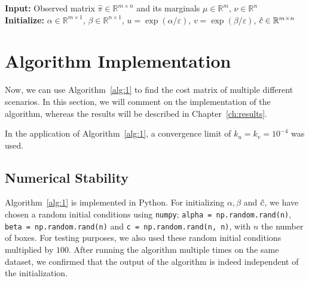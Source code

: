 \vspace{0.3cm}
\begin{algorithm}[t]
	\caption{Cost Learning Algorithm for Inverse OT}
	\textbf{Input: } Observed matrix $\hat{\pi} \in \mathbb{R}^{m \times n}$ and its marginals $\mu \in \mathbb{R}^m$, $\nu \in \mathbb{R}^n$\\
	\textbf{Initialize:} $\alpha \in \mathbb{R}^{m \times 1}$, $\beta \in \mathbb{R}^{n \times 1}$, $u = \exp(\alpha / \varepsilon)$, $v = \exp(\beta / \varepsilon)$, $\hat{c} \in \mathbb{R}^{m \times n}$ \\
	\label{alg:1}
\end{algorithm}


\section{Algorithm Implementation}
\label{sec:algimp}
Now, we can use Algorithm~\ref{alg:1} to find the cost matrix of multiple different scenarios. In this section, we will comment on the implementation of the algorithm, whereas the results will be described in Chapter~\ref{ch:results}. \par 
In the application of Algorithm~\ref{alg:1}, a convergence limit of $k_u = k_v = 10^{-4}$ was used. 

\subsection{Numerical Stability}
Algorithm~\ref{alg:1} is implemented in Python. For initializing $\alpha, \beta$ and $\hat{c}$, we have chosen a random initial conditions using \lstinline|numpy|; \lstinline|alpha = np.random.rand(n)|, \lstinline|beta = np.random.rand(n)| and \lstinline|c = np.random.rand(n, n)|, with $n$ the number of boxes. For testing purposes, we also used these random initial conditions multiplied by $100$. After running the algorithm multiple times on the same dataset, we confirmed that the output of the algorithm is indeed independent of the initialization. \par 

